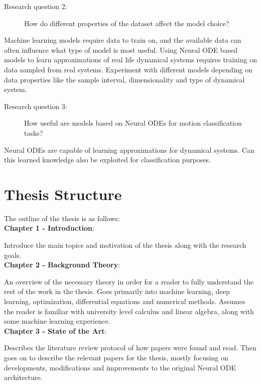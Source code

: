 \documentclass[12pt,a4paper]{book}
\begin{document}
\begin{description}
\item[Research question 2:] {How do different properties of the dataset affect the model choice?}
\end{description}

Machine learning models require data to train on, and the available data can often influence what type of model is most useful. Using Neural ODE based models to learn approximations of real life dynamical systems requires training on data sampled from real systems. Experiment with different models depending on data properties like the sample interval, dimensionality and type of dynamical system.

\begin{description}
\item[Research question 3:] {How useful are models based on Neural ODEs for motion classification tasks?}
\end{description}

Neural ODEs are capable of learning approximations for dynamical systems. Can this learned knowledge also be exploited for classification purposes.

\section{Thesis Structure}
\label{sec:thesisStructure}

The outline of the thesis is as follows: \\

\noindent \textbf{Chapter 1 - Introduction}:

Introduce the main topics and motivation of the thesis along with the research goals. \\

\noindent \textbf{Chapter 2 - Background Theory}:

An overview of the necessary theory in order for a reader to fully understand the rest of the work in the thesis. Goes primarily into machine learning, deep learning, optimization, differential equations and numerical methods. Assumes the reader is familiar with university level calculus and linear algebra, along with some machine learning experience. \\

\noindent \textbf{Chapter 3 - State of the Art}:

Describes the literature review protocol of how papers were found and read. Then goes on to describe the relevant papers for the thesis, mostly focusing on developments, modifications and improvements to the original Neural ODE architecture. \\
\end{document}
